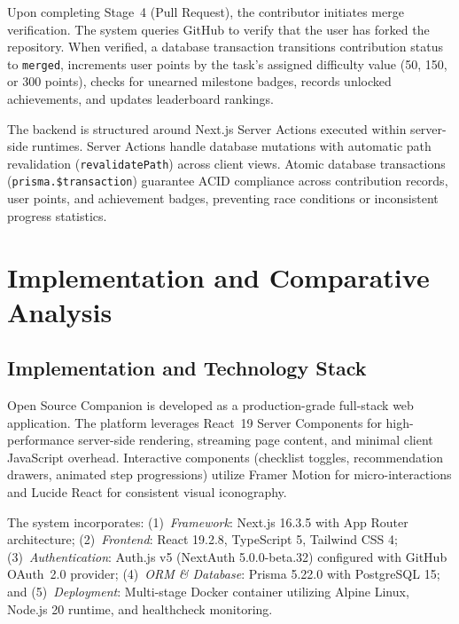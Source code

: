 \documentclass[conference]{IEEEtran}
\begin{document}
Upon completing Stage~4 (Pull Request), the contributor initiates merge verification. The system queries GitHub to verify that the user has forked the repository. When verified, a database transaction transitions contribution status to \texttt{merged}, increments user points by the task's assigned difficulty value (50, 150, or 300 points), checks for unearned milestone badges, records unlocked achievements, and updates leaderboard rankings.

The backend is structured around Next.js Server Actions executed within server-side runtimes. Server Actions handle database mutations with automatic path revalidation (\texttt{revalidatePath}) across client views. Atomic database transactions (\texttt{prisma.\$transaction}) guarantee ACID compliance across contribution records, user points, and achievement badges, preventing race conditions or inconsistent progress statistics.

\section{Implementation and Comparative Analysis}

\subsection{Implementation and Technology Stack}
Open Source Companion is developed as a production-grade full-stack web application. The platform leverages React~19 Server Components for high-performance server-side rendering, streaming page content, and minimal client JavaScript overhead. Interactive components (checklist toggles, recommendation drawers, animated step progressions) utilize Framer Motion for micro-interactions and Lucide React for consistent visual iconography.

The system incorporates: (1)~\textit{Framework}: Next.js 16.3.5 with App Router architecture; (2)~\textit{Frontend}: React 19.2.8, TypeScript 5, Tailwind CSS 4; (3)~\textit{Authentication}: Auth.js v5 (NextAuth 5.0.0-beta.32) configured with GitHub OAuth~2.0 provider; (4)~\textit{ORM \& Database}: Prisma 5.22.0 with PostgreSQL 15; and (5)~\textit{Deployment}: Multi-stage Docker container utilizing Alpine Linux, Node.js 20 runtime, and healthcheck monitoring.
\end{document}
